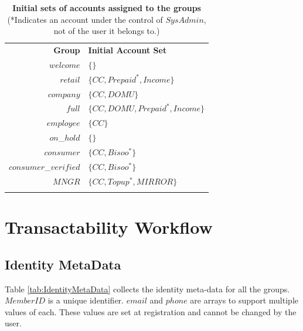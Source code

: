 \begin{table}[h]
\vspace{-0.5cm}
\begin{centering}
{
\begin{tabular}{ r | l  }
\hline
\textbf{Group}	& {\bf Initial Account Set} \\
\Xhline{1.5pt}
$welcome$	& $\{ \}$ \\
\hline
$retail$		& $\{ CC, Prepaid^*, Income \}$ \\
\hline
$company$	& $\{ CC, DOMU \}$ \\
\hline
$full$		& $\{ CC, DOMU, Prepaid^*, Income \}$ \\
\hline
$employee$	& $\{ CC \}$ \\
\hline
$on$\_$hold$	& $\{  \}$ \\
\hline
$consumer$	& $\{ CC, Bisoo^* \}$ \\
\hline
$consumer$\_$verified$ & $\{ CC, Bisoo^* \}$ \\
\hline
$MNGR$ 		& $\{ CC, Topup^*, MIRROR \}$ \\
\Xhline{1.5pt}
\end{tabular}
}
\caption{\small\textbf{Initial sets of accounts assigned to the groups}\\ (*Indicates an account under the control of $SysAdmin$, not of the user it belongs to.)}
\label{tab:InitialAccountSets}
\end{centering}
\vspace{-1cm}
\end{table}

\section{Transactability Workflow}
\subsection{Identity MetaData}
Table \ref{tab:IdentityMetaData} collects the identity meta-data for all the groups. $MemberID$ is a unique identifier. $email$ and $phone$ are arrays to support multiple values of each. These values are set at registration and cannot be changed by the user.

